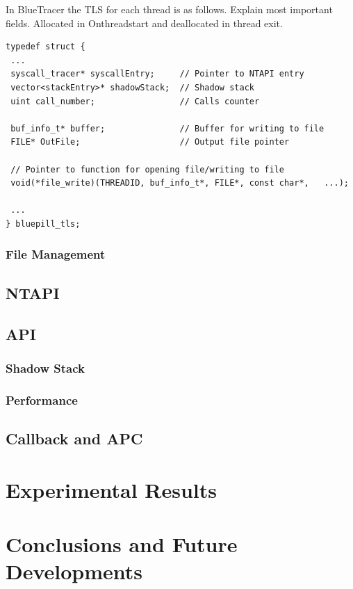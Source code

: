 \documentclass[binding=0.6cm,LaM,english,noexaminfo,oneside]{sapthesis} %
\begin{document}
In BlueTracer the TLS for each thread is as follows. Explain most important fields. Allocated in Onthreadstart and deallocated in thread exit.

\vspace{0.5cm}
\begin{lstlisting}[caption={My Caption},captionpos=b]
typedef struct {
 ...
 syscall_tracer* syscallEntry;     // Pointer to NTAPI entry
 vector<stackEntry>* shadowStack;  // Shadow stack
 uint call_number;             	   // Calls counter							
 
 buf_info_t* buffer;		   	   // Buffer for writing to file				 
 FILE* OutFile;                    // Output file pointer
 
 // Pointer to function for opening file/writing to file	
 void(*file_write)(THREADID, buf_info_t*, FILE*, const char*, 	...);
 
 ...
} bluepill_tls;
\end{lstlisting}

\subsection{File Management}




\section{NTAPI}

\section{API}


\subsection{Shadow Stack}
\subsection{Performance}
\section{Callback and APC} 

\chapter{Experimental Results}

\chapter{Conclusions and Future Developments}

\printbibliography 


\end{document}
